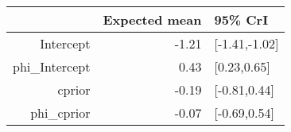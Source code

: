 \begin{tabular}{rrl}
  \hline
 & Expected mean & 95\% CrI \\ 
  \hline
Intercept & -1.21 & [-1.41,-1.02] \\ 
  phi\_Intercept & 0.43 & [0.23,0.65] \\ 
  cprior & -0.19 & [-0.81,0.44] \\ 
  phi\_cprior & -0.07 & [-0.69,0.54] \\ 
   \hline
\end{tabular}

